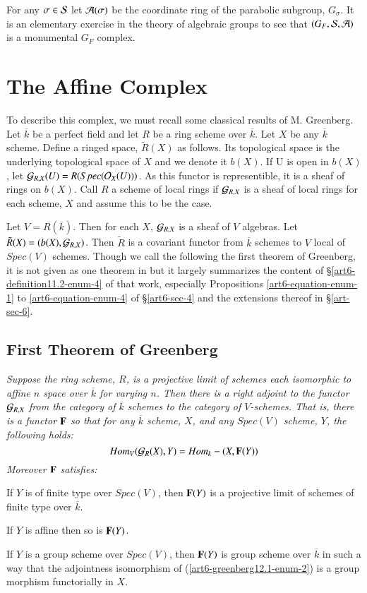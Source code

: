 For any $\sigma \in \mathcal{S}$ let $\mathcal{A}(\sigma)$ be the coordinate ring of the parabolic subgroup, $G_{\sigma}$. It is an elementary exercise in the theory of algebraic groups to see that $(G_{F}, \mathcal{S}, \mathcal{A})$ is a monumental $G_{F}$ complex. 

\section*{The Affine Complex}
To describe this complex, we must recall some classical results of M. Greenberg. Let $\overline{k}$ be a perfect field and let $R$ be a ring scheme over $\overline{k}$. Let $X$ be any $\overline{k}$ scheme. Define a ringed space, $\tilde{R}(X)$ as follows. Its topological space is the underlying topological space of $X$ and we denote it $b(X)$. If U is open in $b(X)$, let $\mathcal{G}_{R, X}(U)= R(Spec(\mathcal{O}_{X}(U)))$. As this functor is representible, it is a sheaf of rings on $b(X)$. Call $R$ a scheme of local rings if $\mathcal{G}_{R, X}$ is a sheaf of local rings for each scheme, $X$ and assume this to be the case. 

Let $V=R(\overline{k})$. Then for each $X$, $\mathcal{G}_{R, X}$ is a sheaf of $V$ algebras. Let $\tilde{R}(X) = (b(X), \mathcal{G}_{R, X})$. Then $\tilde{R}$ is a covariant functor from  $\overline{k}$ schemes to $V$ local of $Spec(V)$ schemes. Though we call the following the first theorem of Greenberg, it is not given as one theorem in \cite{art6-keyMG I} but it largely summarizes the content of \S\ref{art6-definition11.2-enum-4} of that work, especially Propositions \ref{art6-equation-enum-1} to \ref{art6-equation-enum-4} of \S \ref{art6-sec-4} and the extensions thereof in  \S\ref{art-sec-6}.

\subsection{First Theorem of Greenberg}\label{art6-subsec-12.1}
\textit{Suppose the ring scheme, $R$, is a projective limit of schemes each isomorphic to affine $n$ space over $\overline{k}$ for varying $n$. Then there is a right adjoint to the functor $\mathcal{G}_{R, X}$ from the category of $\overline{k}$ schemes to the category of $V$-schemes. That is, there is a functor $\mathbf{F}$ so that for any $\overline{k}$ scheme, $X$, and any $Spec(V)$ scheme, $Y$, the following holds:
$$
Hom_{V}(\mathcal{G}_{R}(X), Y) = Hom_{k}-(X, \mathbf{F}(Y))
$$
Moreover $\mathbf{F}$ satisfies:}
\begin{enumerate}[(1)]
{\it
\item If $Y$ is of finite type over $Spec(V)$, then $\mathbf{F}(Y)$ is a projective limit of schemes of finite type over $\overline{k}$.\label{art6-greenberg12.1-enum-1}

\item If $Y$ is affine then so is $\mathbf{F}(Y)$.\label{art6-greenberg12.1-enum-2}

\item If $Y$ is a group scheme over $Spec(V)$, then $\mathbf{F}(Y)$ is group scheme over $\overline{k}$ in such a way that the adjointness isomorphism of (\ref{art6-greenberg12.1-enum-2}) is a group morphism functorially in $X$.\label{art6-greenberg12.1-enum-3}}
\end{enumerate} 


